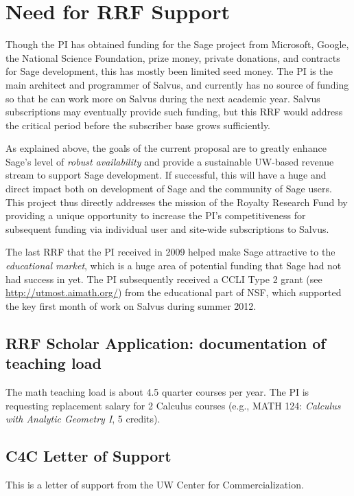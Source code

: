 \documentclass[11pt]{article}
\begin{document}
\section{Need for RRF Support}

Though the PI has obtained funding for the Sage project from
Microsoft, Google, the National Science Foundation, prize money,
private donations, and contracts for Sage development, this has mostly
been limited seed money.  The PI is the main architect and programmer
of Salvus, and currently has no source of funding so that he can work
more on Salvus during the next academic year.  Salvus subscriptions
may eventually provide such funding, but this RRF would address the
critical period before the subscriber base grows sufficiently.


As explained above, the goals of the current proposal are to greatly enhance Sage's level
of {\em robust availability} and provide a sustainable UW-based
revenue stream to support Sage development.  If successful, this will
have a huge and direct impact both on development of Sage and the
community of Sage users.  This project thus directly addresses the
mission of the Royalty Research Fund by providing a unique opportunity
to increase the PI's competitiveness for subsequent funding via
individual user and site-wide subscriptions to Salvus.

The last RRF that the PI received in 2009 helped make Sage attractive
to the {\em educational market}, which is a huge area of potential
funding that Sage had not had success in yet.  The PI subsequently
received a CCLI Type 2 grant (see
\url{http://utmost.aimath.org/}) from the educational part of NSF,
which supported the key first month of work on Salvus during summer 2012.

\subsection{RRF Scholar Application: documentation of teaching load}
The math teaching load is about 4.5 quarter courses per year.  The PI
is requesting replacement salary for 2 Calculus courses (e.g., MATH
124: {\em Calculus with Analytic Geometry I}, 5 credits).

\subsection{C4C Letter of Support}\label{sec:letter}
This is a letter of support from the UW Center for Commercialization.


\end{document}

